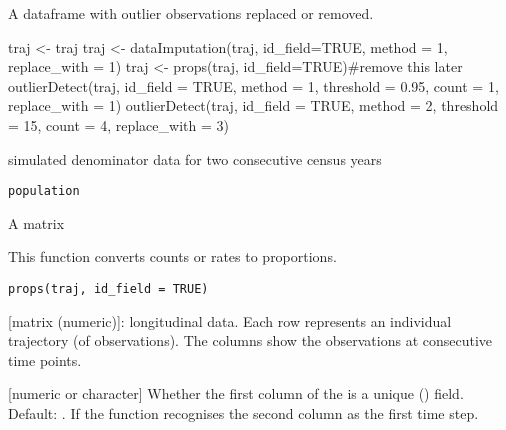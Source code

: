 \documentclass[a4paper]{book}
\begin{document}
%
\begin{Value}
A dataframe with outlier observations replaced or removed.
\end{Value}
%
\begin{Examples}
\begin{ExampleCode}
traj <- traj
traj <- dataImputation(traj, id_field=TRUE, method = 1, replace_with = 1)
traj <- props(traj, id_field=TRUE)#remove this later
outlierDetect(traj, id_field = TRUE, method = 1, threshold = 0.95,
count = 1, replace_with = 1)
outlierDetect(traj, id_field = TRUE, method = 2, threshold = 15,
count = 4, replace_with = 3)
\end{ExampleCode}
\end{Examples}
%
\begin{Description}\relax
simulated denominator data for two consecutive census years
\end{Description}
%
\begin{Usage}
\begin{verbatim}
population
\end{verbatim}
\end{Usage}
%
\begin{Format}
A matrix
\end{Format}
%
\begin{Description}\relax
This function converts counts or rates to proportions.
\end{Description}
%
\begin{Usage}
\begin{verbatim}
props(traj, id_field = TRUE)
\end{verbatim}
\end{Usage}
%
\begin{Arguments}
\begin{ldescription}
\item[\code{traj}] [matrix (numeric)]: longitudinal data. Each row represents an individual trajectory (of observations). The columns show the observations at consecutive time points.

\item[\code{id\_field}] [numeric or character] Whether the first column of the  is a unique () field. Default: . If  the function recognises the second column as the first time step.
\end{ldescription}
\end{Arguments}
\end{document}

